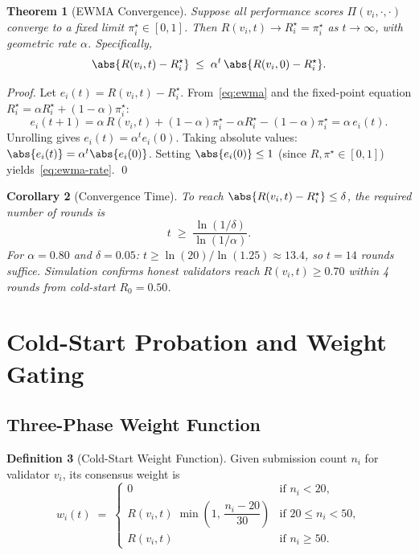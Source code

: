 \documentclass[12pt,a4paper]{article}
\newtheorem{theorem}{Theorem}[section]
\newtheorem{corollary}[theorem]{Corollary}
\theoremstyle{definition}
\newtheorem{definition}[theorem]{Definition}
\theoremstyle{remark}
\begin{document}
\begin{theorem}[EWMA Convergence]
\label{thm:ewma-conv}
Suppose all performance scores $\Pi(v_i,\cdot,\cdot)$ converge to a fixed limit
$\pi_i^\star \in [0,1]$.  Then $R(v_i,t) \to R_i^\star = \pi_i^\star$ as
$t\to\infty$, with geometric rate $\alpha$.  Specifically,
\begin{equation}
  \abs{R(v_i,t) - R_i^\star}
  \;\le\; \alpha^t\,\abs{R(v_i,0) - R_i^\star}.
  \label{eq:ewma-rate}
\end{equation}
\end{theorem}

\begin{proof}
Let $e_i(t) = R(v_i,t) - R_i^\star$.  From~\eqref{eq:ewma} and the fixed-point
equation $R_i^\star = \alpha R_i^\star + (1-\alpha)\pi_i^\star$:
\[
  e_i(t+1) = \alpha\,R(v_i,t)+(1-\alpha)\pi_i^\star
             - \alpha R_i^\star-(1-\alpha)\pi_i^\star
           = \alpha\,e_i(t).
\]
Unrolling gives $e_i(t) = \alpha^t e_i(0)$.
Taking absolute values: $\abs{e_i(t)} = \alpha^t \abs{e_i(0)}$.
Setting $\abs{e_i(0)}\le 1$ (since $R,\pi^\star\in[0,1]$) yields~\eqref{eq:ewma-rate}.
\qed
\end{proof}

\begin{corollary}[Convergence Time]
\label{cor:conv-time}
To reach $\abs{R(v_i,t)-R_i^\star} \le \delta$, the required number of rounds is
\begin{equation}
  t \;\ge\; \frac{\ln(1/\delta)}{\ln(1/\alpha)}.
\end{equation}
For $\alpha=0.80$ and $\delta=0.05$: $t \ge \ln(20)/\ln(1.25) \approx 13.4$,
so $t=14$ rounds suffice.  Simulation confirms honest validators reach
$R(v_i,t) \ge 0.70$ within 4 rounds from cold-start $R_0 = 0.50$.
\end{corollary}

\section{Cold-Start Probation and Weight Gating}
\label{sec:coldstart}

\subsection{Three-Phase Weight Function}

\begin{definition}[Cold-Start Weight Function]
\label{def:coldstart}
Given submission count $n_i$ for validator $v_i$, its consensus weight is
\begin{equation}
  w_i(t) \;=\;
  \begin{cases}
    0 & \text{if } n_i < 20, \\[4pt]
    R(v_i,t)\;\min\!\left(1,\,\dfrac{n_i - 20}{30}\right)
      & \text{if } 20 \le n_i < 50, \\[8pt]
    R(v_i,t) & \text{if } n_i \ge 50.
  \end{cases}
  \label{eq:weight}
\end{equation}
\end{definition}
\end{document}
